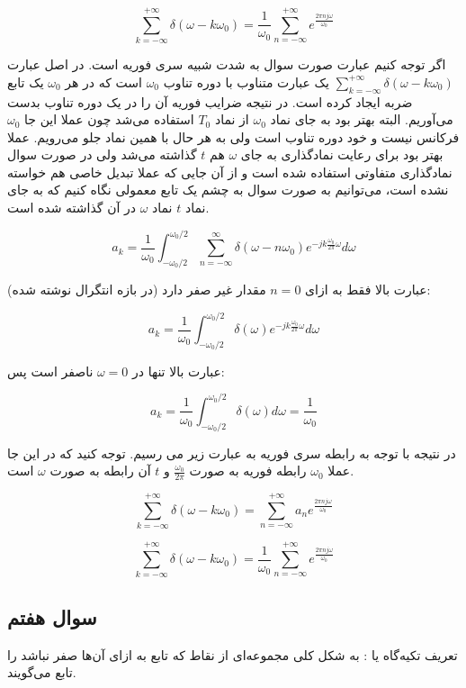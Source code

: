 \documentclass[12pt]{article}
\begin{document}
$$
\sum_{k=-\infty}^{+\infty} \delta\left(\omega-k \omega_{0}\right)=\frac{1}{\omega_{0}} \sum_{n=-\infty}^{+\infty} e^{\frac{2 \pi n j \omega}{\omega_{0}}}
$$

اگر توجه کنیم عبارت صورت سوال به شدت شبیه سری فوریه است. در اصل عبارت
$\sum_{k=-\infty}^{+\infty} \delta\left(\omega-k \omega_{0}\right)$
یک عبارت متناوب با دوره تناوب $\omega_0$ است که در هر $\omega_0$ یک تابع ضربه ایجاد کرده است. در نتیجه ضرایب فوریه آن را در یک دوره تناوب بدست می‌آوریم. البته بهتر بود به جای نماد $\omega_0$ از نماد $T_0$ استفاده می‌شد چون عملا این جا $\omega_0$ فرکانس نیست و خود دوره تناوب است ولی به هر حال با همین نماد جلو می‌رویم. عملا بهتر بود برای رعایت نمادگذاری به جای $\omega$ هم $t$ گذاشته می‌شد ولی در صورت سوال نمادگذاری متفاوتی استفاده شده است و از آن جایی که عملا تبدیل خاصی هم خواسته نشده است، می‌توانیم به صورت سوال به چشم یک تابع معمولی نگاه کنیم که به جای نماد $t$ نماد $\omega$ در آن گذاشته شده است.

$$a_k = \frac{1}{\omega_0} \int_{-\omega_0/2}^{\omega_0/2} \sum_{n=-\infty}^{\infty} \delta (\omega - n \omega_{0} ) e^{-jk\frac{\omega_0}{2 \pi} \omega} d\omega$$

عبارت بالا فقط به ازای $n=0$ مقدار غیر صفر دارد (در بازه انتگرال نوشته شده):

$$a_k = \frac{1}{\omega_0} \int_{-\omega_0/2}^{\omega_0 /2} \delta(\omega) e^{-j k \frac{\omega_0}{2\pi}\omega}  d\omega$$

عبارت بالا تنها در $\omega=0$ ناصفر است پس:

$$a_k = \frac{1}{\omega_0} \int_{-\omega_{0}/2}^{\omega_0/2} \delta(\omega) d\omega = \frac{1}{\omega_0}$$

در نتیجه با توجه به رابطه سری فوریه به عبارت زیر می رسیم. توجه کنید که در این جا عملا
 $\omega_0$
  رابطه فوریه به صورت 
   $\frac{\omega_0}{2\pi}$
   و $t$ آن رابطه به صورت $\omega$ است.
   

$$\sum_{k=-\infty}^{+\infty} \delta\left(\omega-k \omega_{0}\right)= \sum_{n=-\infty}^{+\infty} a_n e^{\frac{2 \pi n j \omega}{\omega_{0}}}$$

$$\sum_{k=-\infty}^{+\infty} \delta\left(\omega-k \omega_{0}\right)=\frac{1}{\omega_{0}} \sum_{n=-\infty}^{+\infty} e^{\frac{2 \pi n j \omega}{\omega_{0}}}$$

\newpage
\subsection{سوال هفتم}

تعریف تکیه‌گاه یا :  به شکل کلی مجموعه‌ای از نقاط که تابع به ازای آن‌ها صفر نباشد را  تابع می‌گویند.
\end{document}
